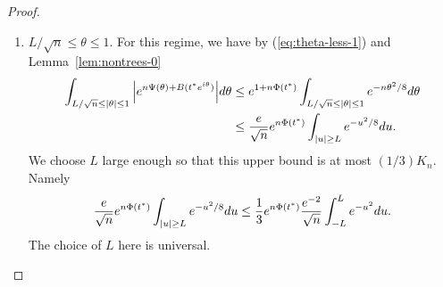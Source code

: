 \documentclass[12pt]{article}
\newcommand{\lr}[1]{\left(#1\right)}
\begin{document}
\begin{proof}
\begin{enumerate}
Assume $n$ sufficiently large such that $L/\sqrt{n}\le \eta$ and
\begin{align}
\frac{CL^3 + 3L}{\sqrt n} \leq \frac{\pi}{3},
\end{align}
Then for $|\theta|\le L/\sqrt{n}$
\begin{align*}
\abs{\Im\lr{n\left(\Psi(\theta)  - \Phi(t^*)\right)+B(t^*e^{i\theta}) - B(t^*)}} \leq Cn|\theta|^3+3|\theta |
\le
\frac{\pi}{3}.
\end{align*}
Using $\cos(\pi/3)=1/2$ we have
\begin{align*}
\Re\int_{|\theta| \leq L/\sqrt n} e^{n\Psi(\theta) + B(t^* e^{i\theta})} d\theta &\geq 
\frac{1}{2} \int_{|\theta| \leq L/\sqrt n} e^{\Re n\Psi(\theta) + \Re B(t^* e^{i\theta})} d\theta.
\end{align*}
By Lemma~\ref{lem:nontrees-0} $|B(t^*)-B(t^*e^{i\theta})|\le |\theta|<1$. Then 
$|\Re(B(t^*e^{i\theta}))-\Re(B(t^*))|<1$, and since $B(t^*)$ is real valued
\begin{align*}
\Re(B(t^*e^{i\theta}))\ge B(t^*)-1\ge -2,
\end{align*}
where in the last inequality Lemma~\ref{lem:nontrees-0} is invoked again. Then
\begin{align*}
\int_{|\theta| \leq L/\sqrt n} e^{\Re n\Psi(\theta) + \Re B(t^* e^{i\theta})} d\theta \ge
e^{-2}\int_{|\theta| \leq L/\sqrt n} e^{\Re n\Psi(\theta) } d\theta.
\end{align*}
Applying the left part of (\ref{eq:Phi-double-tail}) the right-hand side above is at least
\begin{align}
e^{-2}e^{n\Phi(t^*)}\int_{|\theta| \leq L/\sqrt n} e^{-n\theta^2} d\theta=e^{n\Phi(t^*)}{e^{-2}\over \sqrt{n}}\int_{-L}^Le^{-u^2} du
\triangleq K_n. \label{eq:inner-integral}
\end{align}
We note 
\begin{align}
\lim_n {1\over n}\log K_n=\Phi(t^*). \label{eq:lim-Kn}
\end{align}



\item $L/\sqrt{n}\le \theta\le 1$.
For this regime, we have by (\ref{eq:theta-less-1}) and  Lemma~\ref{lem:nontrees-0} 
	\begin{align*}
		\int_{L/\sqrt n \leq |\theta| \leq 1} \abs{e^{n\Psi(\theta) + B(t^* e^{i\theta})}} d\theta 
		&\leq e^{1 + n \Phi(t^*)} \int_{L/\sqrt n \leq |\theta| \leq 1} e^{-n\theta^2/8} d\theta \\
		&\leq \frac{e}{\sqrt n} e^{n\Phi(t^*)} \int_{|u| \geq L} e^{-u^2/8} du.
	\end{align*}
We choose $L$ large enough so that this upper bound is at most $(1/3)K_n$. Namely
\begin{align*}
 \frac{e}{\sqrt n} e^{n\Phi(t^*)} \int_{|u| \geq L} e^{-u^2/8} du
\le
{1\over 3}e^{n\Phi(t^*)}{e^{-2}\over \sqrt{n}}\int_{-L}^Le^{-u^2} du.
\end{align*}
The choice of $L$ here is universal.




\end{enumerate}
\end{proof}
\end{document}
